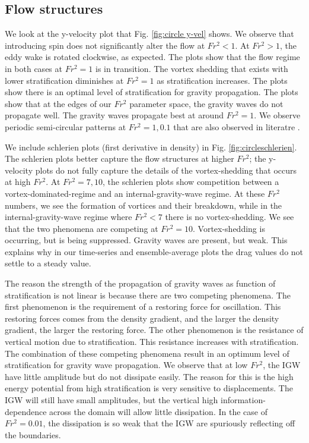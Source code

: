 \subsection{Flow structures}
We look at the y-velocity plot that Fig. \ref{fig:circle y-vel} shows. We observe that introducing spin does not significantly alter the flow at $Fr^2 < 1$. At $Fr^2 > 1$, the eddy wake is rotated clockwise, as expected. The plots show that the flow regime in both cases at $Fr^2 = 1$ is in transition. The vortex shedding that exists with lower stratification diminishes at $Fr^2 = 1$ as stratification increases. The plots show there is an optimal level of stratification for gravity propagation. The plots show that at the edges of our $Fr^2$ parameter space, the gravity waves do not propagate well. The gravity waves propagate best at around $Fr^2 = 1$. We observe periodic semi-circular patterns at $Fr^2 = 1, 0.1$ that are also observed in literatre \cite{ortiz-tarin_stratified_2019}.
 
We include schlerien plots (first derivative in density) in Fig. \ref{fig:circleschlerien}. The schlerien plots better capture the flow structures at higher $Fr^2$; the y-velocity plots do not fully capture the details of the vortex-shedding that occurs at high $Fr^2$. At $Fr^2 = 7, 10$, the schlerien plots show competition between a vortex-dominated-regime and an internal-gravity-wave regime. At these $Fr^2$ numbers, we see the formation of vortices and their breakdown, while in the internal-gravity-wave regime where $Fr^2 < 7$ there is no vortex-shedding. We see that the two phenomena are competing at $Fr^2 = 10$. Vortex-shedding is occurring, but is being suppressed. Gravity waves are present, but weak. This explains why in our time-series and ensemble-average plots the drag values do not settle to a steady value.
 
The reason the strength of the propagation of gravity waves as function of stratification is not linear is because there are two competing phenomena. The first phenomenon is the requirement of a restoring force for oscillation. This restoring forces comes from the density gradient, and the larger the density gradient, the larger the restoring force. The other phenomenon is the resistance of vertical motion due to stratification. This resistance increases with stratification. The combination of these competing phenomena result in an optimum level of stratification for gravity wave propagation. We observe that at low $Fr^2$, the IGW have little amplitude but do not dissipate easily. The reason for this is the high energy potential from high stratification is very sensitive to displacements. The IGW will still have small amplitudes, but the vertical high information-dependence across the domain will allow little dissipation. In the case of $Fr^2 = 0.01$, the dissipation is so weak that the IGW are spuriously reflecting off the boundaries.
 
